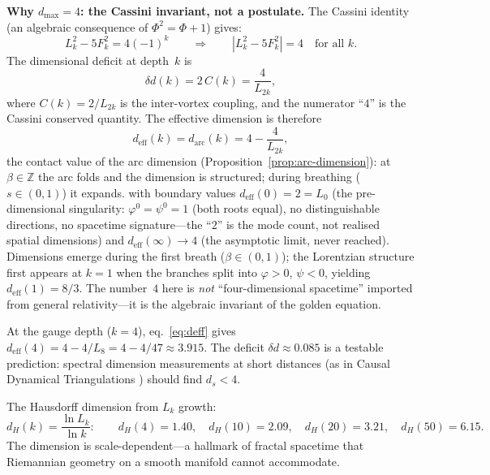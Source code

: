 \documentclass[12pt,a4paper]{article}
\begin{document}
\textbf{Why $d_{\max} = 4$: the Cassini invariant, not a postulate.}
The Cassini identity (an algebraic consequence of $\Phi^2 = \Phi + 1$) gives:
\begin{equation}
L_k^2 - 5 F_k^2 = 4(-1)^k
\qquad \Longrightarrow \qquad
|L_k^2 - 5F_k^2| = 4 \quad \text{for all } k.
\end{equation}
The dimensional deficit at depth~$k$ is
\begin{equation}
\delta d(k) = 2\,C(k) = \frac{4}{L_{2k}},
\end{equation}
where $C(k) = 2/L_{2k}$ is the inter-vortex coupling, and the numerator ``$4$'' is the Cassini conserved quantity. The effective dimension is therefore
\begin{equation}
d_{\mathrm{eff}}(k) = d_{\mathrm{arc}}(k) = 4 - \frac{4}{L_{2k}},
\label{eq:deff}
\end{equation}
the contact value of the arc dimension (Proposition~\ref{prop:arc-dimension}): at $\beta \in \mathbb{Z}$ the arc folds and the dimension is structured; during breathing ($s \in (0,1)$) it expands.
with boundary values $d_{\mathrm{eff}}(0) = 2 = L_0$ (the pre-dimensional singularity: $\varphi^0 = \psi^0 = 1$ (both roots equal), no distinguishable directions, no spacetime signature---the ``$2$'' is the mode count, not realised spatial dimensions) and $d_{\mathrm{eff}}(\infty) \to 4$ (the asymptotic limit, never reached). Dimensions emerge during the first breath ($\beta \in (0,1)$); the Lorentzian structure first appears at $k = 1$ when the branches split into $\varphi > 0$, $\psi < 0$, yielding $d_{\mathrm{eff}}(1) = 8/3$. The number~$4$ here is \emph{not} ``four-dimensional spacetime'' imported from general relativity---it is the algebraic invariant of the golden equation.

At the gauge depth ($k = 4$), eq.~\eqref{eq:deff} gives $d_{\mathrm{eff}}(4) = 4 - 4/L_8 = 4 - 4/47 \approx 3.915$. The deficit $\delta d \approx 0.085$ is a testable prediction: spectral dimension measurements at short distances (as in Causal Dynamical Triangulations \cite{Ambjorn2005}) should find $d_s < 4$.

The Hausdorff dimension from $L_k$ growth:
\begin{equation}
d_H(k) = \frac{\ln L_k}{\ln k}: \qquad d_H(4) = 1.40, \quad d_H(10) = 2.09, \quad d_H(20) = 3.21, \quad d_H(50) = 6.15.
\end{equation}
The dimension is scale-dependent---a hallmark of fractal spacetime that Riemannian geometry on a smooth manifold cannot accommodate.
\end{document}
